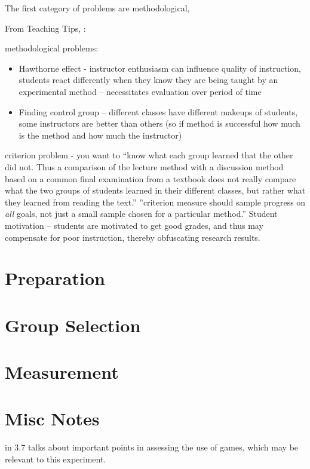 The first category of problems are methodological, 

From Teaching Tips, \cite{teachingTips}:

methodological problems:

\begin{itemize}
	\item Hawthorne effect - instructor enthusiasm can influence quality of instruction, students react differently when they know they are being taught by an experimental method -- necessitates evaluation over period of time
	\item Finding control group -- different classes have different makeups of students, some instructors are better than others (so if method is successful how much is the method and how much the instructor)
\end{itemize}

criterion problem - you want to ``know what each group learned that the other did not.  Thus a comparison of the lecture method with a discussion method based on a common final examination from a textbook does not really compare what the two groups of students learned in their different classes, but rather what they learned from reading the text.''  ''criterion measure should sample progress on \textit{all} goals, not just a small sample chosen for a particular method.''  Student motivation -- students are motivated to get good grades, and thus may compensate for poor instruction, thereby obfuscating research results.

\section{Preparation}


\section{Group Selection}


\section{Measurement}

\section{Misc Notes}

\cite{Bayliss09} in 3.7 talks about important points in assessing the use of games, which may be relevant to this experiment.